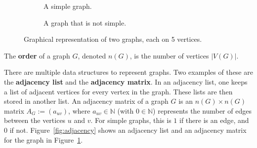 \begin{figure}
\centering
\begin{subfigure}{0.35\textwidth}
\centering
{}

\caption{A simple graph.}
\label{fig:example-simple}
\end{subfigure}
\qquad
\begin{subfigure}{0.35\textwidth}
\centering
{}

\caption{A graph that is not simple.}
\label{fig:example-non-planar}
\end{subfigure}
\caption{Graphical representation of two graphs, each on 5 vertices.}
\label{fig:example}
\end{figure}

\begin{definition}[Order]
  The \textbf{order} of a graph $G$, denoted $n(G)$, is the number of vertices $|V(G)|$.
\end{definition}

There are multiple data structures to represent graphs. Two examples of these are the \textbf{adjacency list} and the \textbf{adjacency matrix}. In an adjacency list, one keeps a list of adjacent vertices for every vertex in the graph. These lists are then stored in another list. An adjacency matrix of a graph $G$ is an $n(G) \times n(G)$ matrix $A_G := (a_{uv})$, where $a_{uv} \in \mathbb{N}$ (with $0 \in \mathbb{N}$) represents the number of edges between the vertices $u$ and $v$. For simple graphs, this is $1$ if there is an edge, and $0$ if not. Figure~\ref{fig:adjacency} shows an adjacency list and an adjacency matrix for the graph in Figure~\ref{fig:example-simple}.

